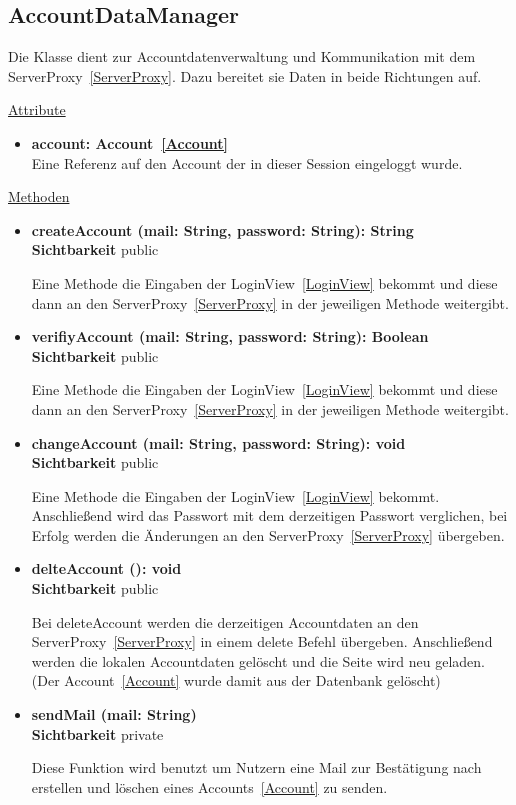 \newpage
\subsection{AccountDataManager}\label{AccountDataManager}
Die Klasse dient zur Accountdatenverwaltung und Kommunikation mit dem ServerProxy~\eqref{ServerProxy}. Dazu bereitet sie Daten in beide Richtungen auf.

\underline{Attribute}
\begin{itemize}
\itemsep0pt

\item \textbf{account: Account~\eqref{Account}} \hfill\\ 
Eine Referenz auf den Account der in dieser Session eingeloggt wurde.

\end{itemize}

\underline{Methoden}
\begin{itemize}
\itemsep0pt
\item \textbf{createAccount (mail: String, password: String): String}\hfill\\
\textbf{Sichtbarkeit} public

Eine Methode die Eingaben der LoginView~\eqref{LoginView} bekommt und diese dann an den ServerProxy~\eqref{ServerProxy} in der jeweiligen Methode weitergibt.

\item \textbf{verifiyAccount (mail: String, password: String): Boolean}\hfill\\
\textbf{Sichtbarkeit} public

Eine Methode die Eingaben der LoginView~\eqref{LoginView} bekommt und diese dann an den ServerProxy~\eqref{ServerProxy} in der jeweiligen Methode weitergibt.

\item \textbf{changeAccount (mail: String, password: String): void}\hfill\\
\textbf{Sichtbarkeit} public

Eine Methode die Eingaben der LoginView~\eqref{LoginView} bekommt. Anschließend wird das Passwort mit dem derzeitigen Passwort verglichen, bei Erfolg werden die Änderungen an den ServerProxy~\eqref{ServerProxy} übergeben.

\item \textbf{delteAccount (): void}\hfill\\
\textbf{Sichtbarkeit} public

Bei deleteAccount werden die derzeitigen Accountdaten an den ServerProxy~\eqref{ServerProxy} in einem delete Befehl übergeben. Anschließend werden die lokalen Accountdaten gelöscht und die Seite wird neu geladen. 
(Der Account~\eqref{Account} wurde damit aus der Datenbank gelöscht)

\item \textbf{sendMail (mail: String)}\hfill\\
\textbf{Sichtbarkeit} private

Diese Funktion wird benutzt um Nutzern eine Mail zur Bestätigung nach erstellen und löschen eines Accounts~\eqref{Account} zu senden.
\end{itemize}